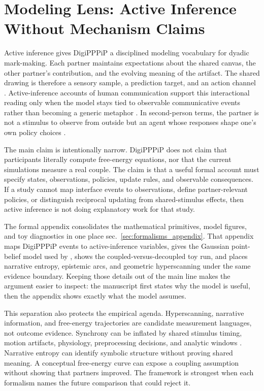 \documentclass[
  english,
]{article}
\begin{document}
\newpage

\section{Modeling Lens: Active Inference Without Mechanism
Claims}\label{sec:active_inference}

Active inference gives DigiPPPiP a disciplined modeling vocabulary for
dyadic mark-making. Each partner maintains expectations about the shared
canvas, the other partner's contribution, and the evolving meaning of
the artifact. The shared drawing is therefore a sensory sample, a
prediction target, and an action channel
\citep{friston2010fep, friston2017process, ramstead2020two}.
Active-inference accounts of human communication support this
interactional reading only when the model stays tied to observable
communicative events rather than becoming a generic metaphor
\citep{vasil2020communication}. In second-person terms, the partner is
not a stimulus to observe from outside but an agent whose responses
shape one's own policy choices
\citep{schilbach2013secondperson, redcay2019secondperson, bolis2024secondperson}.

The main claim is intentionally narrow. DigiPPPiP does not claim that
participants literally compute free-energy equations, nor that the
current simulations measure a real couple. The claim is that a useful
formal account must specify states, observations, policies, update
rules, and observable consequences. If a study cannot map interface
events to observations, define partner-relevant policies, or distinguish
reciprocal updating from shared-stimulus effects, then active inference
is not doing explanatory work for that study.

The formal appendix consolidates the mathematical primitives, model
figures, and toy diagnostics in one place
sec.~\ref{sec:formalisms_appendix}. That appendix maps DigiPPPiP events
to active-inference variables, gives the Gaussian point-belief model
used by , shows the
coupled-versus-decoupled toy run, and places narrative entropy,
epistemic arcs, and geometric hyperscanning under the same evidence
boundary. Keeping those details out of the main line makes the argument
easier to inspect: the manuscript first states why the model is useful,
then the appendix shows exactly what the model assumes.

This separation also protects the empirical agenda. Hyperscanning,
narrative information, and free-energy trajectories are candidate
measurement languages, not outcome evidence. Synchrony can be inflated
by shared stimulus timing, motion artifacts, physiology, preprocessing
decisions, and analytic windows
\citep{tachtsidis2016fnirs, hamilton2021hyperscanning, zimmermann2024methodological}.
Narrative entropy can identify symbolic structure without proving shared
meaning. A conceptual free-energy curve can expose a coupling assumption
without showing that partners improved. The framework is strongest when
each formalism names the future comparison that could reject it.
\end{document}
